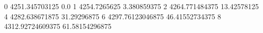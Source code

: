 0 4251.345703125 0.0
1 4254.7265625 3.380859375
2 4264.771484375 13.42578125
4 4282.638671875 31.29296875
6 4297.76123046875 46.41552734375
8 4312.92724609375 61.58154296875
